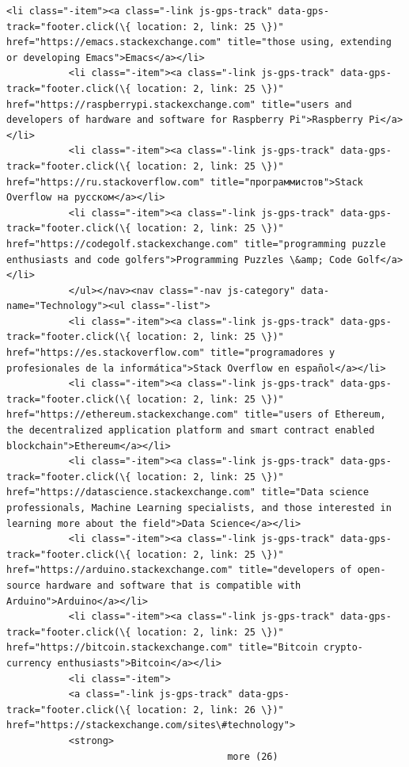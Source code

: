 \documentclass[11pt]{article}
\begin{document}
\begin{Verbatim}[commandchars=\\\{\}]
           <li class="-item"><a class="-link js-gps-track" data-gps-track="footer.click(\{ location: 2, link: 25 \})" href="https://emacs.stackexchange.com" title="those using, extending or developing Emacs">Emacs</a></li>
           <li class="-item"><a class="-link js-gps-track" data-gps-track="footer.click(\{ location: 2, link: 25 \})" href="https://raspberrypi.stackexchange.com" title="users and developers of hardware and software for Raspberry Pi">Raspberry Pi</a></li>
           <li class="-item"><a class="-link js-gps-track" data-gps-track="footer.click(\{ location: 2, link: 25 \})" href="https://ru.stackoverflow.com" title="программистов">Stack Overflow на русском</a></li>
           <li class="-item"><a class="-link js-gps-track" data-gps-track="footer.click(\{ location: 2, link: 25 \})" href="https://codegolf.stackexchange.com" title="programming puzzle enthusiasts and code golfers">Programming Puzzles \&amp; Code Golf</a></li>
           </ul></nav><nav class="-nav js-category" data-name="Technology"><ul class="-list">
           <li class="-item"><a class="-link js-gps-track" data-gps-track="footer.click(\{ location: 2, link: 25 \})" href="https://es.stackoverflow.com" title="programadores y profesionales de la informática">Stack Overflow en español</a></li>
           <li class="-item"><a class="-link js-gps-track" data-gps-track="footer.click(\{ location: 2, link: 25 \})" href="https://ethereum.stackexchange.com" title="users of Ethereum, the decentralized application platform and smart contract enabled blockchain">Ethereum</a></li>
           <li class="-item"><a class="-link js-gps-track" data-gps-track="footer.click(\{ location: 2, link: 25 \})" href="https://datascience.stackexchange.com" title="Data science professionals, Machine Learning specialists, and those interested in learning more about the field">Data Science</a></li>
           <li class="-item"><a class="-link js-gps-track" data-gps-track="footer.click(\{ location: 2, link: 25 \})" href="https://arduino.stackexchange.com" title="developers of open-source hardware and software that is compatible with Arduino">Arduino</a></li>
           <li class="-item"><a class="-link js-gps-track" data-gps-track="footer.click(\{ location: 2, link: 25 \})" href="https://bitcoin.stackexchange.com" title="Bitcoin crypto-currency enthusiasts">Bitcoin</a></li>
           <li class="-item">
           <a class="-link js-gps-track" data-gps-track="footer.click(\{ location: 2, link: 26 \})" href="https://stackexchange.com/sites\#technology">
           <strong>
                                       more (26)

\end{Verbatim}
\end{document}
